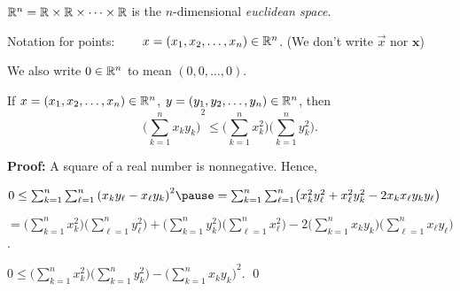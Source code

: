 \documentclass[10pt,aspectratio=149]{beamer}
\begin{document}
\begin{frame}
${\mathbb{R}}^n = {\mathbb{R}} \times {\mathbb{R}} \times \cdots \times {\mathbb{R}}$
is the
$n$-dimensional \emph{euclidean space}.

\pause
Notation for points: ~~~ $x =(x_1,x_2,\ldots,x_n) \in {\mathbb{R}}^n$.
\pause
\qquad (We don't write $\vec{x}$ nor $\mathbf{x}$)

\pause
We also write $0 \in {\mathbb{R}}^n$ to mean $(0,0,\ldots,0)$.

\pause

\begin{lemma}
If $x =(x_1,x_2,\ldots,x_n) \in {\mathbb{R}}^n$, $y =(y_1,y_2,\ldots,y_n) \in
{\mathbb{R}}^n$, then
\begin{equation*}
{\biggl( \sum_{k=1}^n x_k y_k \biggr)}^2
\leq
\biggl(\sum_{k=1}^n x_k^2 \biggr)
\biggl(\sum_{k=1}^n y_k^2 \biggr) .
\end{equation*}
\end{lemma}

\pause
\textbf{Proof:}
A square of a real number is nonnegative.
\pause
Hence,

\medskip

$
0
\leq 
\sum_{k=1}^n \sum_{\ell=1}^n {(x_k y_\ell - x_\ell y_k)}^2
\pause
=
\sum_{k=1}^n \sum_{\ell=1}^n
\bigl( x_k^2 y_\ell^2 + x_\ell^2 y_k^2 - 2 x_k x_\ell y_k y_\ell \bigr)
$

\pause
\medskip

\quad
$=
\biggl( \sum_{k=1}^n x_k^2 \biggr)
\biggl( \sum_{\ell=1}^n y_\ell^2 \biggr)
+
\biggl( \sum_{k=1}^n y_k^2 \biggr)
\biggl( \sum_{\ell=1}^n x_\ell^2 \biggr)
-
2
\biggl( \sum_{k=1}^n x_k y_k \biggr)
\biggl( \sum_{\ell=1}^n x_\ell y_\ell \biggr)$.

\pause
\medskip

\thus \quad 
$0 \leq 
\biggl( \sum_{k=1}^n x_k^2 \biggr)
\biggl( \sum_{k=1}^n y_k^2 \biggr)
-
{\biggl( \sum_{k=1}^n x_k y_k \biggr)}^2$.
\qed

\end{frame}
\end{document}
